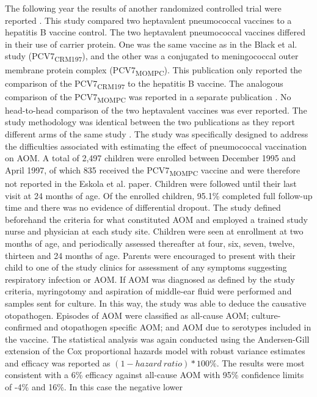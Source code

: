 \documentclass[]{book}
\theoremstyle{definition}
\theoremstyle{definition}
\theoremstyle{definition}
\theoremstyle{remark}
\begin{document}
The following year the results of another randomized controlled trial
were reported \citep{Eskola2001}. This study compared two heptavalent
pneumococcal vaccines to a hepatitis B vaccine control. The two
heptavalent pneumococcal vaccines differed in their use of carrier
protein. One was the same vaccine as in the Black et al. study
(PCV7\textsubscript{CRM197}), and the other was a conjugated to
meningococcal outer membrane protein complex
(PCV7\textsubscript{MOMPC}). This publication only reported the
comparison of the PCV7\textsubscript{CRM197} to the hepatitis B vaccine.
The analogous comparison of the PCV7\textsubscript{MOMPC} was reported
in a separate publication \citep{Kilpi2003}. No head-to-head comparison
of the two heptavalent vaccines was ever reported. The study methodology
was identical between the two publications as they report different arms
of the same study \citep{Eskola2001, Kilpi2003}. The study was
specifically designed to address the difficulties associated with
estimating the effect of pneumococcal vaccination on AOM. A total of
2,497 children were enrolled between December 1995 and April 1997, of
which 835 received the PCV7\textsubscript{MOMPC} vaccine and were
therefore not reported in the Eskola et al. paper. Children were
followed until their last visit at 24 months of age. Of the enrolled
children, 95.1\% completed full follow-up time and there was no evidence
of differential dropout. The study defined beforehand the criteria for
what constituted AOM and employed a trained study nurse and physician at
each study site. Children were seen at enrollment at two months of age,
and periodically assessed thereafter at four, six, seven, twelve,
thirteen and 24 months of age. Parents were encouraged to present with
their child to one of the study clinics for assessment of any symptoms
suggesting respiratory infection or AOM. If AOM was diagnosed as defined
by the study criteria, myringotomy and aspiration of middle-ear fluid
were performed and samples sent for culture. In this way, the study was
able to deduce the causative otopathogen. Episodes of AOM were
classified as all-cause AOM; culture-confirmed and otopathogen specific
AOM; and AOM due to serotypes included in the vaccine. The statistical
analysis was again conducted using the Andersen-Gill extension of the
Cox proportional hazards model with robust variance estimates and
efficacy was reported as \((1 - hazard\ ratio) *100\%\). The results
were most consistent with a 6\% efficacy against all-cause AOM with 95\%
confidence limits of -4\% and 16\%. In this case the negative lower
\end{document}

